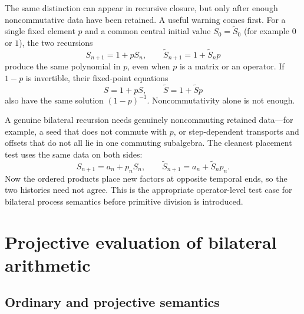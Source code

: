 \documentclass[11pt]{article}
\theoremstyle{definition}
\theoremstyle{remark}
\begin{document}
The same distinction can appear in recursive closure, but only after enough
noncommutative data have been retained.  A useful warning comes first.  For a
single fixed element \(p\) and a common central initial value
\(S_0=\widetilde S_0\) (for example \(0\) or \(1\)), the two recursions
\[
S_{n+1}=1+pS_n,
\qquad
\widetilde S_{n+1}=1+\widetilde S_n p
\]
produce the same polynomial in \(p\), even when \(p\) is a matrix or an
operator.  If \(1-p\) is invertible, their fixed-point equations
\[
S=1+pS,
\qquad
\widetilde S=1+\widetilde S p
\]
also have the same solution \((1-p)^{-1}\).  Noncommutativity alone is not
enough.

A genuine bilateral recursion needs genuinely noncommuting retained data---for
example, a seed that does not commute with \(p\), or step-dependent transports
and offsets that do not all lie in one commuting subalgebra.  The cleanest
placement test uses the same data on both sides:
\[
S_{n+1}=a_n+p_nS_n,
\qquad
\widetilde S_{n+1}=a_n+\widetilde S_np_n.
\]
Now the ordered products place new factors at opposite temporal ends, so the
two histories need not agree.  This is the appropriate operator-level test
case for bilateral process semantics before primitive division is introduced.

\section{Projective evaluation of bilateral arithmetic}

\subsection{Ordinary and projective semantics}
\end{document}
